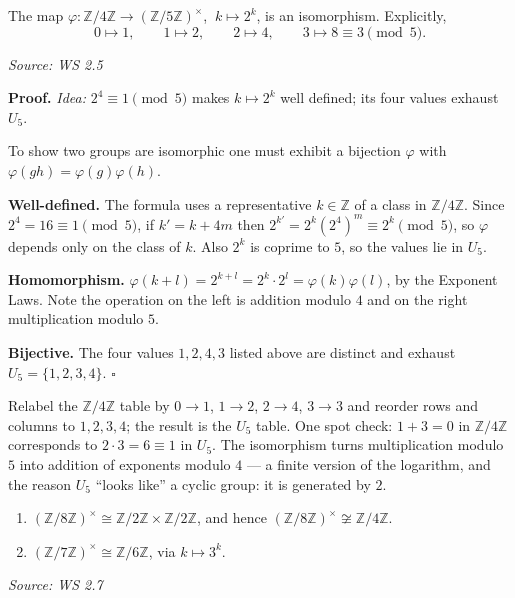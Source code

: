 \documentclass[11pt]{report}
\renewenvironment{proof}[1][Proof]{\noindent\textbf{#1.} }{\hfill$\square$\par\vspace{5pt}}
\newcommand{\srcline}[1]{\par\hfill{\footnotesize\textit{Source: #1}}}
\begin{document}
\begin{propbox}\label{prop:z-4z-iso-u5}
The map $\varphi: \mathbb{Z}/4\mathbb{Z} \to (\mathbb{Z}/5\mathbb{Z})^\times$, $\ k \mapsto 2^k$, is an isomorphism. Explicitly,
\[ 0 \mapsto 1, \qquad 1 \mapsto 2, \qquad 2 \mapsto 4, \qquad 3 \mapsto 8 \equiv 3 \pmod 5. \]
\srcline{WS 2.5}
\end{propbox}

\begin{proof}
\textit{Idea:} $2^4 \equiv 1 \pmod 5$ makes $k \mapsto 2^k$ well defined; its four values exhaust $U_5$.\par
To show two groups are isomorphic one must exhibit a bijection $\varphi$ with $\varphi(gh) = \varphi(g)\varphi(h)$.

\textbf{Well-defined.} The formula uses a representative $k \in \mathbb{Z}$ of a class in $\mathbb{Z}/4\mathbb{Z}$. Since $2^4 = 16 \equiv 1 \pmod 5$, if $k' = k + 4m$ then $2^{k'} = 2^k (2^4)^m \equiv 2^k \pmod 5$, so $\varphi$ depends only on the class of $k$. Also $2^k$ is coprime to $5$, so the values lie in $U_5$.

\textbf{Homomorphism.} $\varphi(k + l) = 2^{k+l} = 2^k \cdot 2^l = \varphi(k)\varphi(l)$, by the Exponent Laws. Note the operation on the left is addition modulo $4$ and on the right multiplication modulo $5$.

\textbf{Bijective.} The four values $1, 2, 4, 3$ listed above are distinct and exhaust $U_5 = \{1, 2, 3, 4\}$.
\end{proof}

\begin{rembox}\label{rem:reading-isomorphism-off-tables}
Relabel the $\mathbb{Z}/4\mathbb{Z}$ table by $0 \to 1$, $1 \to 2$, $2 \to 4$, $3 \to 3$ and reorder rows and columns to $1, 2, 3, 4$; the result is the $U_5$ table. One spot check: $1 + 3 = 0$ in $\mathbb{Z}/4\mathbb{Z}$ corresponds to $2 \cdot 3 = 6 \equiv 1$ in $U_5$. The isomorphism turns multiplication modulo $5$ into addition of exponents modulo $4$ --- a finite version of the logarithm, and the reason $U_5$ ``looks like'' a cyclic group: it is generated by $2$.
\end{rembox}

\begin{propbox}[{$U_8$ and $U_7$}]\label{prop:u8-u7}
\begin{enumerate}
    \item $(\mathbb{Z}/8\mathbb{Z})^\times \cong \mathbb{Z}/2\mathbb{Z} \times \mathbb{Z}/2\mathbb{Z}$, and hence $(\mathbb{Z}/8\mathbb{Z})^\times \not\cong \mathbb{Z}/4\mathbb{Z}$.
    \item $(\mathbb{Z}/7\mathbb{Z})^\times \cong \mathbb{Z}/6\mathbb{Z}$, via $k \mapsto 3^k$.
\end{enumerate}
\srcline{WS 2.7}
\end{propbox}
\end{document}
